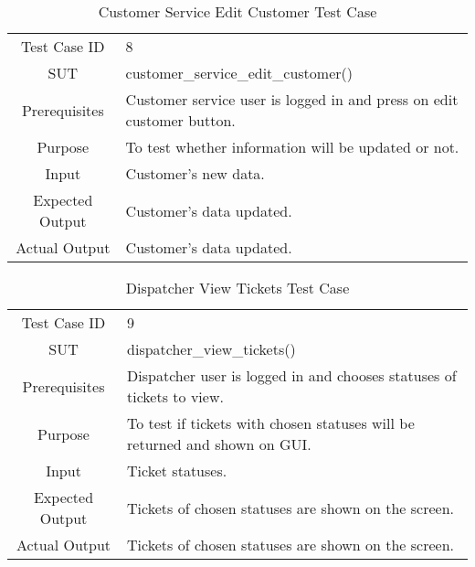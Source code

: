 	\begin{table}[H]
		\centering
		\renewcommand{\arraystretch}{1.5}
		\begin{tabular}[t]{ c  m{10cm} }
			Test Case ID & 8  \\
			SUT & customer\_service\_edit\_customer() \\
			Prerequisites & Customer service user is logged in and press on edit customer button. \\
			Purpose & To test whether information will be updated or not. \\
			Input & Customer's new data. \\
			Expected Output & Customer's data updated. \\
			Actual Output & Customer's data updated. \\
		\end{tabular}
		\caption{Customer Service Edit Customer Test Case}
		\renewcommand{\arraystretch}{1.0}
	\end{table}
	
	\begin{table}[H]
		\centering
		\renewcommand{\arraystretch}{1.5}
		\begin{tabular}[t]{ c  m{10cm} }
			Test Case ID & 9  \\
			SUT & dispatcher\_view\_tickets() \\
			Prerequisites & Dispatcher user is logged in and chooses statuses of tickets to view. \\
			Purpose & To test if tickets with chosen statuses will be returned and shown on GUI. \\
			Input & Ticket statuses. \\
			Expected Output & Tickets of chosen statuses are shown on the screen. \\
			Actual Output & Tickets of chosen statuses are shown on the screen. \\
		\end{tabular}
		\caption{Dispatcher View Tickets Test Case}
		\renewcommand{\arraystretch}{1.0}
	\end{table}
	
